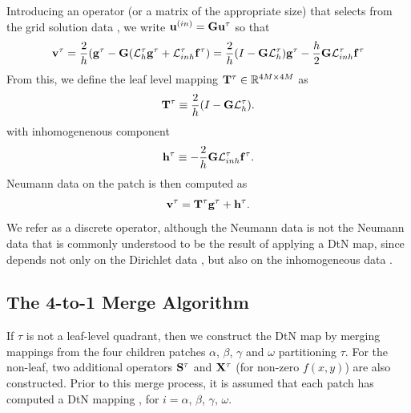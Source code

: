 Introducing an operator (or a matrix of the appropriate size) \Gop that selects \uin from the grid solution data \utau, we write $\mathbf u^{(in)} = \mathbf G \mathbf u^{\tau}$ so that
\begin{equation}
\mathbf v^{\tau} = \frac{2}{h}(\mathbf g^{\tau} - \mathbf G (\mathcal L_h^{\tau} \mathbf g^{\tau} + \mathcal L_{inh}^{\tau} \mathbf f^{\tau}) = 
\frac{2}{h}(I - \mathbf G \mathcal L_h^{\tau})\mathbf g^{\tau} - \frac{h}{2}\mathbf G \mathcal L_{inh}^{\tau} \mathbf f^{\tau}
\end{equation}
From this, we define the leaf level \DtN mapping $\mathbf T^{\tau} \in \mathbb R^{4M \times 4M}$ as
\begin{equation}
\mathbf T^{\tau} \equiv \frac{2}{h}(I - \mathbf G\mathcal L_h^{\tau}).
\label{eq:map_D2N}
\end{equation}
with inhomogenenous component
\begin{equation}
\mathbf h^{\tau} \equiv -\frac{2}{h}\mathbf G\mathcal L_{inh}^{\tau} \mathbf f^{\tau}. 
\end{equation}
Neumann data on the patch is then computed as
\begin{equation}
\mathbf v^{\tau} = \mathbf T^{\tau} \mathbf g^{\tau} + \mathbf h^{\tau}.
\label{eq:vtau}
\end{equation}
We refer \Ttau as a discrete \DtN operator, although the Neumann data \vtau is not the Neumann data that is commonly understood to be the result of applying a DtN map, since \vtau depends not only on the Dirichlet data \gtau, but also on the inhomogeneous data \ftau.  

\subsection{The 4-to-1 Merge Algorithm}
\label{sub:4-to-1merge}
If $\tau$ is not a leaf-level quadrant, then we construct the DtN map  by merging mappings from the four children patches $\alpha$, $\beta$, $\gamma$ and $\omega$  partitioning $\tau$.  For the non-leaf, two additional operators $\mathbf S^{\tau}$ and $\mathbf X^{\tau}$ (for non-zero $f(x,y)$) are also constructed.  Prior to this merge process, it is assumed that each patch has computed a DtN mapping \Ti, for $i=\alpha$, $\beta$, $\gamma$, $\omega$. 

